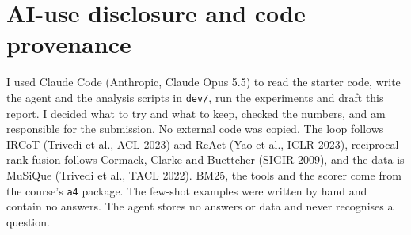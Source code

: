 \documentclass[10pt,a4paper]{article}
\begin{document}
\vfill
\section{AI-use disclosure and code provenance}
I used Claude Code (Anthropic, Claude Opus 5.5) to read the starter code, write the agent and the analysis scripts
in \texttt{dev/}, run the experiments and draft this report. I decided what to try and what to keep, checked the
numbers, and am responsible for the submission. No external code was copied. The loop follows IRCoT (Trivedi et
al., ACL 2023) and ReAct (Yao et al., ICLR 2023), reciprocal rank fusion follows Cormack, Clarke and Buettcher
(SIGIR 2009), and the data is MuSiQue (Trivedi et al., TACL 2022). BM25, the tools and the scorer come from the
course's \texttt{a4} package. The few-shot examples were written by hand and contain no answers. The agent stores
no answers or data and never recognises a question.
\end{document}
